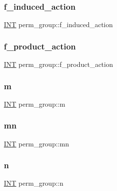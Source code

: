 \subsubsection{\texorpdfstring{f\+\_\+induced\+\_\+action}{f\_induced\_action}}
{\footnotesize\ttfamily \mbox{\hyperlink{galois_8h_a09fddde158a3a20bd2dcadb609de11dc}{I\+NT}} perm\+\_\+group\+::f\+\_\+induced\+\_\+action}

\mbox{\label{classperm__group_a78f62caa0e1852f5f038d586050a52aa}} 
\subsubsection{\texorpdfstring{f\+\_\+product\+\_\+action}{f\_product\_action}}
{\footnotesize\ttfamily \mbox{\hyperlink{galois_8h_a09fddde158a3a20bd2dcadb609de11dc}{I\+NT}} perm\+\_\+group\+::f\+\_\+product\+\_\+action}

\mbox{\label{classperm__group_a1b0cc375208b3e7c8da7c9caf38fbc0e}} 
\subsubsection{\texorpdfstring{m}{m}}
{\footnotesize\ttfamily \mbox{\hyperlink{galois_8h_a09fddde158a3a20bd2dcadb609de11dc}{I\+NT}} perm\+\_\+group\+::m}

\mbox{\label{classperm__group_af2d9fd248ae040958eb9f9a0422d4977}} 
\subsubsection{\texorpdfstring{mn}{mn}}
{\footnotesize\ttfamily \mbox{\hyperlink{galois_8h_a09fddde158a3a20bd2dcadb609de11dc}{I\+NT}} perm\+\_\+group\+::mn}

\mbox{\label{classperm__group_aca09b99f70d6bffb5bfb0b6a7b105403}} 
\subsubsection{\texorpdfstring{n}{n}}
{\footnotesize\ttfamily \mbox{\hyperlink{galois_8h_a09fddde158a3a20bd2dcadb609de11dc}{I\+NT}} perm\+\_\+group\+::n}

